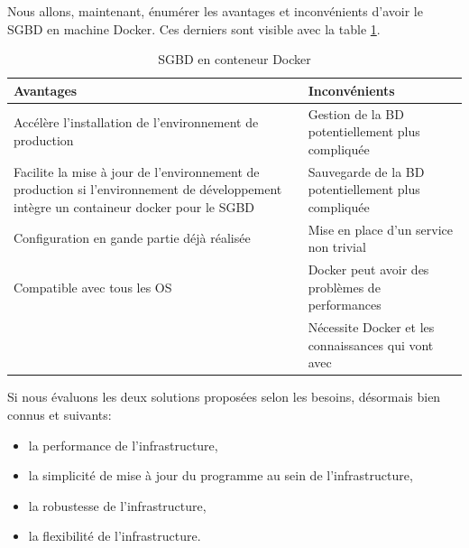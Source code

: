 \documentclass[
    iai, %
    il, %
]{heig-tb}
\begin{document}
Nous allons, maintenant, énumérer les avantages et inconvénients d'avoir le SGBD en machine
Docker. Ces derniers sont visible avec la table \ref{prod-db-docker}.

\begin{table}[h]
    \begin{center}
        \caption{SGBD en conteneur Docker \label{prod-db-docker}}
        \begin{tabularx}{1.0\textwidth} {X|X}
            Avantages                                                & Inconvénients                                                        \\ \hline
            Accélère l'installation de l'environnement de production & Gestion de la BD
            potentiellement plus compliquée                                                                                                 \\
            Facilite la mise à jour de l'environnement de production si l'environnement de
            développement intègre un containeur docker pour le SGBD  & Sauvegarde de la BD
            potentiellement plus compliquée                                                                                                 \\
            Configuration en gande partie déjà réalisée              & Mise en place d'un service non trivial                               \\
            Compatible avec tous les OS                              & Docker peut avoir des problèmes de performances
            \cite{labrecque}                                                                                                                \\
                                                                     & Nécessite Docker et les connaissances qui vont avec \cite{labrecque} \\
        \end{tabularx}
    \end{center}
\end{table}

Si nous évaluons les deux solutions proposées selon les besoins, désormais bien connus et suivants:
\begin{itemize}
    \item la performance de l'infrastructure,
    \item la simplicité de mise à jour du programme au sein de l'infrastructure,
    \item la robustesse de l'infrastructure,
    \item la flexibilité de l'infrastructure.
\end{itemize}
\end{document}
